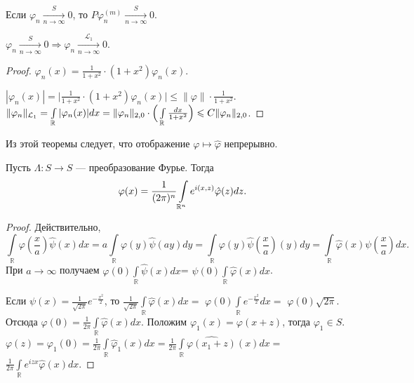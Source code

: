\documentclass[12pt,titlepage, a4paper]{article}
\begin{document}
\begin{theorem}
Если $\varphi_n \xrightarrow[n\rightarrow \infty]{S} 0$, то
$P\varphi_{n}^{(m)} \xrightarrow[n\rightarrow \infty]{S} 0$.
\end{theorem}

\begin{theorem}
$\varphi_n \xrightarrow[n\rightarrow \infty]{S} 0 \Rightarrow
\varphi_n \xrightarrow[n\rightarrow \infty]{\mathcal{L}_1} 0$.
\end{theorem}

\begin{proof}
$\varphi_n(x)=\frac{1}{1+x^2}\cdot (1+x^2)\varphi_n(x)$.

$|\varphi_n(x)|=\Big|\frac{1}{1+x^2}\cdot
(1+x^2)\varphi_n(x)\Big|\leqslant \|\varphi\|\cdot \frac{1}{1+x^2}$.
$\|\varphi_n\|_{\mathcal{L}_1}=\int\limits_\mathbb{R}|\varphi_n(x)|dx\p=\|\varphi_n\|_{2,0}\cdot
\Big(\int\limits_\mathbb{R}\frac{dx}{1+x^2}\Big)\leqslant
C\|\varphi_n\|_{2,0}$.
\end{proof}

\begin{zam}
Из этой теоремы следует, что отображение $\varphi \mapsto \hat
\varphi$ непрерывно.
\end{zam}

\begin{theorem} Пусть $\Lambda \colon S \rightarrow S$ --- преобразование Фурье.
Тогда $$\varphi
(x)\p=\frac{1}{(2\pi)^n}\int\limits_{\mathbb{R}^n}e^{i(x,z)}\hat
\varphi(z)dz.$$
\end{theorem}

\begin{proof}
Действительно,
$$\int\limits_\mathbb{R}\varphi(\frac{x}{a})\hat\psi(x)dx=
a\int\limits_\mathbb{R}\varphi(y)\hat\psi(ay)dy=
\int\limits_\mathbb{R}\varphi(y)\hat\psi(\frac{x}{a})(y)dy=
\int\limits_\mathbb{R}\hat\varphi(x)\psi(\frac{x}{a})dx.$$ При
$a\rightarrow \infty$ получаем
$\varphi(0)\int\limits_\mathbb{R}\hat\psi(x)dx$=
$\psi(0)\int\limits_\mathbb{R}\hat\varphi(x)dx$.

Если $\psi (x)=\frac{1}{\sqrt{2\pi}}e^{-\frac{x^2}{2}}$, то
$\frac{1}{\sqrt{2\pi}}\int\limits_{\mathbb{R}}\hat\varphi (x)dx=$
$\varphi (0)\int\limits_{\mathbb{R}}e^{-\frac{x^2}{2}}dx=$ $\varphi
(0)\sqrt{2\pi}$. Отсюда $\varphi
(0)=\frac{1}{2\pi}\int\limits_{\mathbb{R}}\hat\varphi (x)dx$.
Положим $\varphi_1(x)=\varphi (x+z)$, тогда $\varphi_1\in S$.
$\varphi
(z)=\varphi_1(0)=\frac{1}{2\pi}\int\limits_{\mathbb{R}}\hat\varphi_1
(x)dx=$$\frac{1}{2\pi}\int\limits_{\mathbb{R}}\widehat{\varphi
(x_1+z)}(x)dx=$
$\frac{1}{2\pi}\int\limits_{\mathbb{R}}e^{izx}\hat\varphi (x)dx$.
\end{proof}
\end{document}
